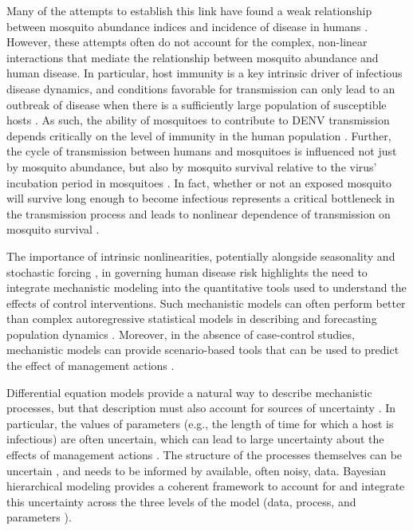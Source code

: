 \documentclass[10pt,letterpaper]{article}
\begin{document}
Many of the attempts to establish this link have found a weak relationship between mosquito abundance indices and incidence of disease in humans \cite{Bowman2014, Pepin2015, Cromwell2017}.
However, these attempts often do not account for the complex, non-linear interactions that mediate the relationship between mosquito abundance and human disease.
In particular, host immunity is a key intrinsic driver of infectious disease dynamics, and conditions favorable for transmission can only lead to an outbreak of disease when there is a sufficiently large population of susceptible hosts \cite{Koelle2004, Koelle2005}.
As such, the ability of mosquitoes to contribute to DENV transmission depends critically on the level of immunity in the human population \cite{Scott2010a}.
Further, the cycle of transmission between humans and mosquitoes is influenced not just by mosquito abundance, but also by mosquito survival relative to the virus' incubation period in mosquitoes \cite{Smith2012}.
In fact, whether or not an exposed mosquito will survive long enough to become infectious represents a critical bottleneck in the transmission process and leads to nonlinear dependence of transmission on mosquito survival \cite{Smith2012}.

The importance of intrinsic nonlinearities, potentially alongside seasonality and stochastic forcing \cite{Ellner1998, Koelle2004, Grenfell2002}, in governing human disease risk highlights the need to integrate mechanistic modeling into the quantitative tools used to understand the effects of control interventions.
Such mechanistic models can often perform better than complex autoregressive statistical models in describing and forecasting population dynamics \cite{Reilly2005}.
Moreover, in the absence of case-control studies, mechanistic models can provide scenario-based tools that can be used to predict the effect of management actions \cite{Buckland2007}.

Differential equation models provide a natural way to describe mechanistic processes, but that description must also account for sources of uncertainty \cite{Hotelling1927, Wikle2010}.
In particular, the values of parameters (e.g., the length of time for which a host is infectious) are often uncertain, which can lead to large uncertainty about the effects of management actions \cite{Elderd2006}.
The structure of the processes themselves can be uncertain \cite{Ellner1998}, and needs to be informed by available, often noisy, data.
Bayesian hierarchical modeling provides a coherent framework to account for and integrate this uncertainty across the three levels of the model (data, process, and parameters \cite{Berliner1996, Cressie2009}).
\end{document}

